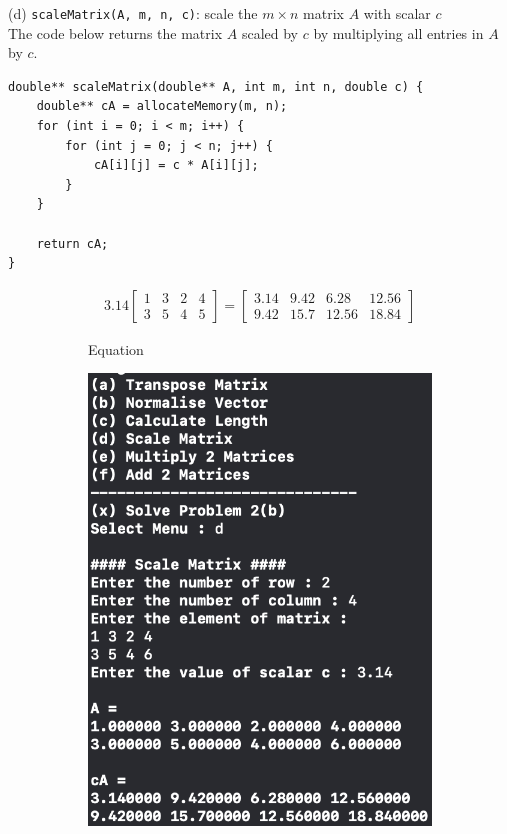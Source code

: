 (d) \texttt{scaleMatrix(A, m, n, c)}: scale the $m \times n$ matrix $A$ with scalar $c$\\
The code below returns the matrix $A$ scaled by $c$ by multiplying all entries in $A$ by $c$.
\begin{verbatim}
double** scaleMatrix(double** A, int m, int n, double c) {
    double** cA = allocateMemory(m, n);
    for (int i = 0; i < m; i++) {
        for (int j = 0; j < n; j++) {
            cA[i][j] = c * A[i][j];
        }
    }
    
    return cA;
}
\end{verbatim}
\begin{figure}[h]
    \centering
    \begin{subfigure}[b]{0.45\textwidth}
        \centering
        \begin {align*}
        3.14\begin{bmatrix}
            1&3&2&4\\3&5&4&5
        \end{bmatrix} = \begin{bmatrix}
                3.14&9.42&6.28&12.56\\
                9.42&15.7&12.56&18.84
            \end{bmatrix}
        \end {align*}
        \caption{Equation}
        \label{fig:equation}
    \end{subfigure}
    \hfill
    \begin{subfigure}[b]{0.45\textwidth}
        \centering
        \includegraphics[width=\textwidth]{img/prj0/d.png}

\end{subfigure}
\end{figure}
